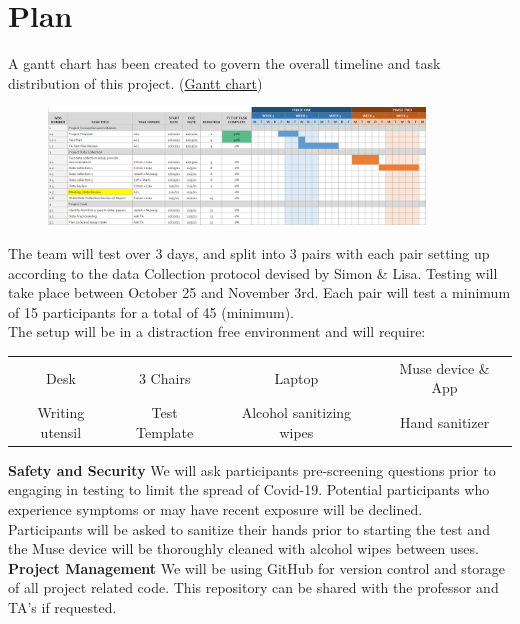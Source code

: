 \documentclass[a4paper]{article}
\begin{document}


\section{Plan}

A gantt chart has been created to govern the overall timeline and task distribution of this project.
({\href{https://docs.google.com/spreadsheets/d/1qmQjmoMOXTPG9QAKZYcwapSyiNY8_c84OKD3P4-Kbx8/edit#gid=0}{Gantt chart}})\\
\begin{figure}[H]
    \centering
    \includegraphics[width=10cm]{Gantt}
    \label{fig:galaxy}
\end{figure}

The team will test over 3 days, and split into 3 pairs with each pair setting up according to the data Collection protocol devised by Simon \& Lisa. Testing will take place between October 25 and November 3rd. Each pair will test a minimum of 15 participants for a total of 45 (minimum).\\

The setup will be in a distraction free environment and will require:
\begin{center}
\begin{tabular}{ c c c c}
 Desk & 3 Chairs & Laptop & Muse device \& App \\ 
 Writing utensil & Test Template & Alcohol sanitizing wipes & Hand sanitizer   
\end{tabular}
\end{center}

\textbf{Safety and Security}
We will ask participants pre-screening questions prior to engaging in testing to limit the spread of Covid-19. Potential participants who experience symptoms or may have recent exposure will be declined.\\

Participants will be asked to sanitize their hands prior to starting the test and the Muse device will be thoroughly cleaned with alcohol wipes between uses.\\

\textbf{Project Management}
We will be using GitHub for version control and storage of all project related code.  This repository can be shared with the professor and TA’s if requested.\\

\end{document}
